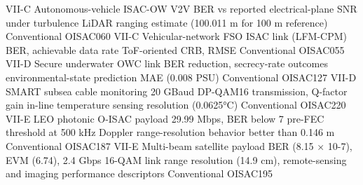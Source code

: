 {}\markdownRendererPipe{} VII-C \markdownRendererPipe{} Autonomous-vehicle ISAC-OW V2V \markdownRendererPipe{} BER vs reported electrical-plane SNR under turbulence \markdownRendererPipe{} LiDAR ranging estimate (100.011 m for 100 m reference) \markdownRendererPipe{} Conventional \markdownRendererPipe{} O\markdownRendererUnderscore{}ISAC\markdownRendererUnderscore{}060 \markdownRendererPipe{}\markdownRendererSoftLineBreak
{}\markdownRendererPipe{} VII-C \markdownRendererPipe{} Vehicular-network FSO ISAC link (LFM-CPM) \markdownRendererPipe{} BER, achievable data rate \markdownRendererPipe{} ToF-oriented CRB, RMSE \markdownRendererPipe{} Conventional \markdownRendererPipe{} O\markdownRendererUnderscore{}ISAC\markdownRendererUnderscore{}055 \markdownRendererPipe{}\markdownRendererSoftLineBreak
{}\markdownRendererPipe{} VII-D \markdownRendererPipe{} Secure underwater OWC link \markdownRendererPipe{} BER reduction, secrecy-rate outcomes \markdownRendererPipe{} environmental-state prediction MAE (0.008 PSU) \markdownRendererPipe{} Conventional \markdownRendererPipe{} O\markdownRendererUnderscore{}ISAC\markdownRendererUnderscore{}127 \markdownRendererPipe{}\markdownRendererSoftLineBreak
{}\markdownRendererPipe{} VII-D \markdownRendererPipe{} SMART subsea cable monitoring \markdownRendererPipe{} 20 GBaud DP-QAM16 transmission, Q-factor gain \markdownRendererPipe{} in-line temperature sensing resolution (0.0625°C) \markdownRendererPipe{} Conventional \markdownRendererPipe{} O\markdownRendererUnderscore{}ISAC\markdownRendererUnderscore{}220 \markdownRendererPipe{}\markdownRendererSoftLineBreak
{}\markdownRendererPipe{} VII-E \markdownRendererPipe{} LEO photonic O-ISAC payload \markdownRendererPipe{} 29.99 Mbps, BER below 7\markdownRendererPercentSign{} pre-FEC threshold at 500 kHz Doppler \markdownRendererPipe{} range-resolution behavior better than 0.146 m \markdownRendererPipe{} Conventional \markdownRendererPipe{} O\markdownRendererUnderscore{}ISAC\markdownRendererUnderscore{}187 \markdownRendererPipe{}\markdownRendererSoftLineBreak
{}\markdownRendererPipe{} VII-E \markdownRendererPipe{} Multi-beam satellite payload \markdownRendererPipe{} BER (8.15 × 10\markdownRendererCircumflex{}-7), EVM (6.74\markdownRendererPercentSign{}), 2.4 Gbps 16-QAM link \markdownRendererPipe{} range resolution (14.9 cm), remote-sensing and imaging performance descriptors \markdownRendererPipe{} Conventional \markdownRendererPipe{} O\markdownRendererUnderscore{}ISAC\markdownRendererUnderscore{}195 \markdownRendererPipe{}\markdownRendererParagraphSeparator
{}\markdownRendererParagraphSeparator
